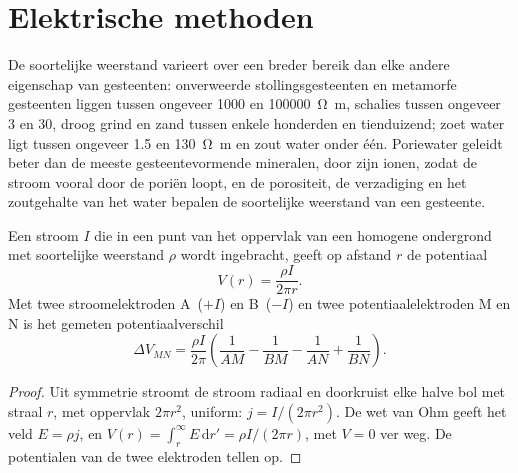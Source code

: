 \section{Elektrische methoden}\label{sec:b3:field-lab-methods-3:electrical}

De soortelijke weerstand varieert over een breder bereik dan elke andere eigenschap van gesteenten:
onverweerde stollingsgesteenten en metamorfe gesteenten liggen tussen ongeveer
\num{1000} en \qty{100000}{\ohm\metre}, schalies tussen ongeveer
\num{3} en \num{30}, droog grind en zand tussen enkele honderden en
tienduizend; zoet water ligt tussen ongeveer \num{1.5} en
\qty{130}{\ohm\metre} en zout water onder één. Poriewater geleidt
beter dan de meeste gesteentevormende mineralen, door zijn ionen, zodat de stroom
vooral door de poriën loopt, en de porositeit, de verzadiging en
het zoutgehalte van het water bepalen de soortelijke weerstand van een gesteente.

\begin{theorem}\label{thm:b3:field-lab-methods-3:point-source}
Een stroom $I$ die in een punt van het oppervlak van een homogene ondergrond
met soortelijke weerstand $\rho$ wordt ingebracht, geeft op afstand $r$ de potentiaal
\[
V(r) = \frac{\rho I}{2\pi r} .
\]
Met twee stroomelektroden A~($+I$) en B~($-I$) en twee
potentiaalelektroden M en N is het gemeten potentiaalverschil
\[
\Delta V_{MN} = \frac{\rho I}{2\pi}\left(\frac{1}{AM} - \frac{1}{BM}
               - \frac{1}{AN} + \frac{1}{BN}\right) .
\]
\end{theorem}

\begin{proof}
Uit symmetrie stroomt de stroom radiaal en doorkruist elke halve bol met
straal $r$, met oppervlak $2\pi r^2$, uniform: $j = I/(2\pi r^2)$. De wet van Ohm
geeft het veld $E = \rho j$, en $V(r) = \int_r^\infty E\,\mathrm{d}r'
= \rho I/(2\pi r)$, met $V = 0$ ver weg. De potentialen van de twee
elektroden tellen op.
\end{proof}

